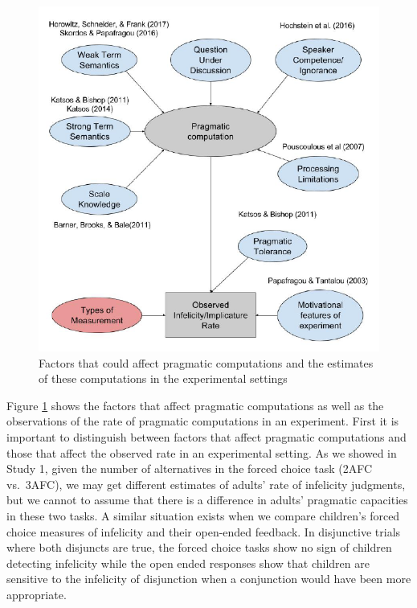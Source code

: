 \documentclass[floatsintext,man]{apa6}
\theoremstyle{definition}
\theoremstyle{definition}
\theoremstyle{definition}
\theoremstyle{remark}
\begin{document}
\begin{figure}
\centering
\includegraphics{figs/implicatureGraph-1.pdf}
\caption{\label{fig:implicatureGraph}Factors that could affect pragmatic
computations and the estimates of these computations in the experimental
settings}
\end{figure}

Figure \ref{fig:implicatureGraph} shows the factors that affect
pragmatic computations as well as the observations of the rate of
pragmatic computations in an experiment. First it is important to
distinguish between factors that affect pragmatic computations and those
that affect the observed rate in an experimental setting. As we showed
in Study 1, given the number of alternatives in the forced choice task
(2AFC vs.~3AFC), we may get different estimates of adults' rate of
infelicity judgments, but we cannot to assume that there is a difference
in adults' pragmatic capacities in these two tasks. A similar situation
exists when we compare children's forced choice measures of infelicity
and their open-ended feedback. In disjunctive trials where both
disjuncts are true, the forced choice tasks show no sign of children
detecting infelicity while the open ended responses show that children
are sensitive to the infelicity of disjunction when a conjunction would
have been more appropriate.
\end{document}
